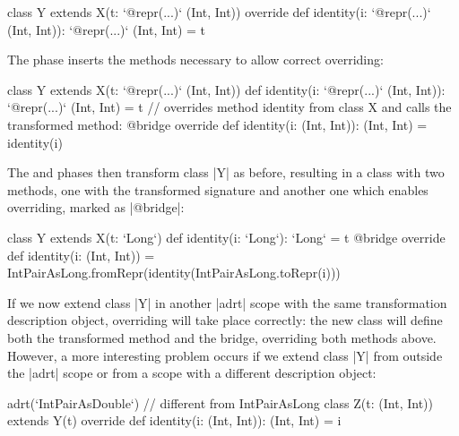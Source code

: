 \begin{lstlisting-nobreak}
class Y extends X(t: `@repr(...)` (Int, Int)) {
  override def identity(i: `@repr(...)` (Int, Int)): `@repr(...)` (Int, Int) = t
}
\end{lstlisting-nobreak}

The \bridge{} phase inserts the methods necessary to allow correct overriding:

\begin{lstlisting-nobreak}
class Y extends X(t: `@repr(...)` (Int, Int)) {
  def identity(i: `@repr(...)` (Int, Int)): `@repr(...)` (Int, Int) = t
  // overrides method identity from class X and calls the transformed method:
  @bridge override def identity(i: (Int, Int)): (Int, Int) = identity(i)
}
\end{lstlisting-nobreak}

The \coerce{} and \commit{} phases then transform class |Y| as before, resulting in a class with two methods, one with the transformed signature and another one which enables overriding, marked as |@bridge|:

\begin{lstlisting-nobreak}
class Y extends X(t: `Long`) {
  def identity(i: `Long`): `Long` = t
  @bridge override def identity(i: (Int, Int)) =
    IntPairAsLong.fromRepr(identity(IntPairAsLong.toRepr(i)))
}
\end{lstlisting-nobreak}

If we now extend class |Y| in another |adrt| scope with the same transformation description object, overriding will take place correctly: the new class will define both the transformed method and the bridge, overriding both methods above. However, a more interesting problem occurs if we extend class |Y| from outside the |adrt| scope or from a scope with a different description object:

\begin{lstlisting-nobreak}
adrt(`IntPairAsDouble`) { // different from IntPairAsLong
  class Z(t: (Int, Int)) extends Y(t) {
    override def identity(i: (Int, Int)): (Int, Int) = i
  }
}
\end{lstlisting-nobreak}

%
%

